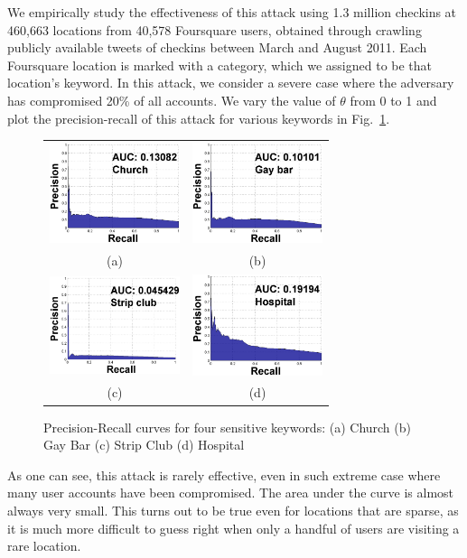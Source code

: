 We empirically study the effectiveness of this attack using 1.3 million checkins at 460,663 locations from 40,578 Foursquare users, obtained through crawling publicly available tweets of checkins between March and August 2011. Each Foursquare location is marked with a category, which we assigned to be that location's keyword. In this attack, we consider a severe case where the adversary has compromised 20\% of all accounts. We vary the value of $\theta$ from 0 to 1 and plot the precision-recall of this attack for various keywords in Fig.~\ref{fig:inference}.
\begin{figure}[tbp]
\centering
\begin{tabular}[1]{cc}
\hspace{-0.35cm}\includegraphics[width=1.5in]{fig/keyword/inf_church_pr.eps}
&
\hspace{-0.35cm}\includegraphics[width=1.5in]{fig/keyword/inf_gaybar_pr.eps}
\\
(a) & (b) \\

\hspace{-0.35cm}\includegraphics[width=1.5in]{fig/keyword/inf_stripclub_pr.eps}
&
\hspace{-0.35cm}\includegraphics[width=1.5in]{fig/keyword/inf_hospital_pr.eps}
\\
(c) & (d) \\
\end{tabular}
\caption{Precision-Recall curves for four sensitive keywords: (a) Church (b) Gay Bar (c) Strip Club (d) Hospital}
\label{fig:inference}
\end{figure}
As one can see, this attack is rarely effective, even in such extreme case where many user accounts have been compromised. The area under the curve is almost always very small. 
This turns out to be true even for locations that are sparse, as it is much more difficult to guess right when only a handful of users are visiting a rare location. 

